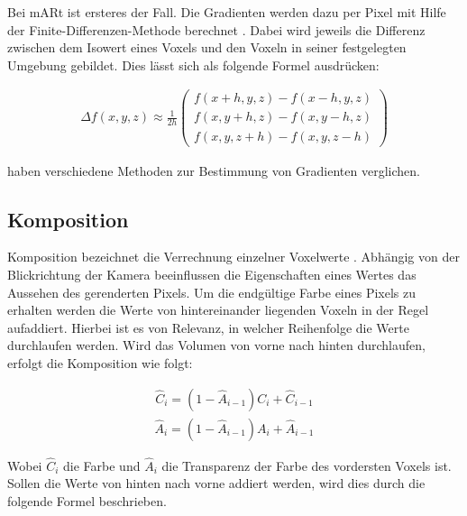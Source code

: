 Bei mARt ist ersteres der Fall. Die Gradienten werden dazu per Pixel mit Hilfe der Finite-Differenzen-Methode berechnet \cite{Hadwiger06}.
Dabei wird jeweils die Differenz zwischen dem Isowert eines Voxels und den Voxeln in seiner festgelegten Umgebung gebildet. Dies lässt sich als folgende Formel ausdrücken: 

\begin{align}
\Delta f(x,y,z)\approx \frac{1}{2h}
\left ( \begin{matrix}
f(x + h, y, z) - f(x - h, y, z)\\ 
f(x, y + h, z) - f(x, y - h, z)\\ 
f(x, y, z + h) - f(x, y, z - h)
\end{matrix} \right )
\end{align}


\cite{Correa11} haben verschiedene Methoden zur Bestimmung von Gradienten verglichen.

\subsection{Komposition}

Komposition bezeichnet die Verrechnung einzelner Voxelwerte \cite{Fernando04}. Abhängig von der Blickrichtung der Kamera beeinflussen die Eigenschaften eines Wertes das Aussehen des gerenderten Pixels. Um die endgültige Farbe eines Pixels zu erhalten werden die Werte von hintereinander liegenden Voxeln in der Regel aufaddiert. Hierbei ist es von Relevanz, in welcher Reihenfolge die Werte durchlaufen werden. Wird das Volumen von vorne nach hinten durchlaufen, erfolgt die Komposition wie folgt:

\begin{align}
\hat{C}_{i}=(1-\hat{A}_{i-1})C_{i}+\hat{C}_{i-1}
\end{align}
\begin{align}
\hat{A}_{i}=(1-\hat{A}_{i-1})A_{i}+\hat{A}_{i-1}
\end{align}


Wobei $\hat{C}_{i}$ die Farbe und $\hat{A}_{i}$ die Transparenz der Farbe des vordersten Voxels ist.
Sollen die Werte von hinten nach vorne addiert werden, wird dies durch die folgende Formel beschrieben.

